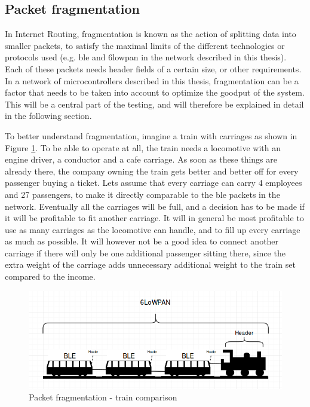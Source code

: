 \subsection{Packet fragmentation}

\noindent In Internet Routing, fragmentation is known as the action of splitting data into smaller \glspl{packet}, to satisfy the maximal limits of the different technologies or protocols used (e.g. \gls{ble} and \gls{6lowpan} in the network described in this thesis). Each of these packets needs header fields of a certain size, or other requirements. In a network of \glspl{microcontroller} described in this thesis, fragmentation can be a factor that needs to be taken into account to optimize the goodput of the system. This will be a central part of the testing, and will therefore be explained in detail in the following section. 

\noindent To better understand fragmentation, imagine a train with carriages as shown in Figure \ref{fig:trainExample}. To be able to operate at all, the train needs a locomotive with an engine driver, a conductor and a cafe carriage. As soon as these things are already there, the company owning the train gets better and better off for every passenger buying a ticket. Lets assume that every carriage can carry 4 employees and 27 passengers, to make it directly comparable to the \gls{ble} packets in the network. Eventually all the carriages will be full, and a decision has to be made if it will be profitable to fit another carriage. It will in general be most profitable to use as many carriages as the locomotive can handle, and to fill up every carriage as much as possible. It will however not be a good idea to connect another carriage if there will only be one additional passenger sitting there, since the extra weight of the carriage adds unnecessary additional weight to the train set compared to the income. 

\begin{figure}[ht]
    \centering
    \includegraphics[scale=0.5]{trainExample.png}    
    \caption{Packet fragmentation - train comparison}
    \label{fig:trainExample}
\end{figure}

